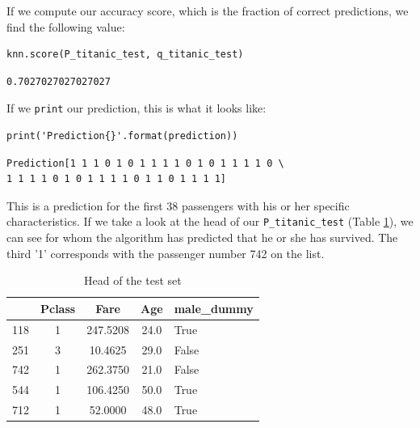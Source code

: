 \documentclass[11pt]{article}
\begin{document}
If we compute our accuracy score, which is the fraction of correct predictions, we find the following value:

\begin{verbatim}
knn.score(P_titanic_test, q_titanic_test)
\end{verbatim}

\begin{verbatim}
0.7027027027027027
\end{verbatim}

If we \texttt{print} our prediction, this is what it looks like: 

\begin{verbatim}
print('Prediction{}'.format(prediction))
\end{verbatim}

\begin{verbatim}
Prediction[1 1 1 0 1 0 1 1 1 1 0 1 0 1 1 1 1 0 \
1 1 1 1 0 1 0 1 1 1 1 0 1 1 0 1 1 1 1]

\end{verbatim}

This is a prediction for the first 38 passengers with his or her specific characteristics. If we take a look at the head of our \texttt{P\_titanic\_test} (Table \ref{tab:tableptest}), we can see for whom the algorithm has predicted that he or she has survived. The third '1' corresponds with the passenger number 742 on the list. 

\begin{table}
\small
\begin{center}
\caption{\label{tab:tableptest}Head of the test set}
\begin{tabular}{|l|c|c|c|l|}
\toprule
\hline
{} &  Pclass &      Fare &   Age &  male\_dummy \\
\midrule
\hline
118 &       1 &  247.5208 &  24.0 &        True \\
251 &       3 &   10.4625 &  29.0 &       False \\
742 &       1 &  262.3750 &  21.0 &       False \\
544 &       1 &  106.4250 &  50.0 &        True \\
712 &       1 &   52.0000 &  48.0 &        True \\
\bottomrule
\hline
\end{tabular}
\end{center}
\end{table}
\end{document}
